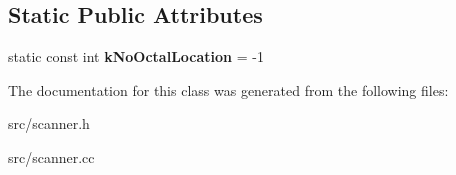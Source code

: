 \subsection*{Static Public Attributes}
\begin{DoxyCompactItemize}
\item 
\hypertarget{classv8_1_1internal_1_1_scanner_a3ee71c47804e353b42e2c114ee1471ed}{}static const int {\bfseries k\+No\+Octal\+Location} = -\/1\label{classv8_1_1internal_1_1_scanner_a3ee71c47804e353b42e2c114ee1471ed}

\end{DoxyCompactItemize}


The documentation for this class was generated from the following files\+:\begin{DoxyCompactItemize}
\item 
src/scanner.\+h\item 
src/scanner.\+cc\end{DoxyCompactItemize}
